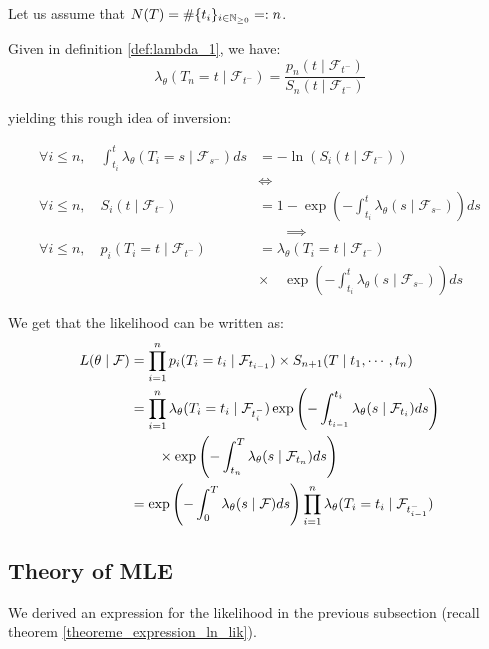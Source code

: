 \begin{demo}{}{}
Let us assume that $N(T) = \# \{  t_i  \}_{ i \in \mathbb{N}_{\geq 0}} =: n$.

Given in definition \ref{def:lambda_1}, we have:
$$\lambda_{\theta}( T_n = t \mid \mathcal F_{t^-} ) = \frac{ p_n( t \mid \mathcal F_{t^-} )}{S_n( t \mid \mathcal F_{t^-} )}$$


yielding this rough idea of inversion:

\begin{align*}
\forall i \leq n, \quad \int_{t_i}^t \lambda_{\theta}( T_i = s \mid \mathcal F_{s^-} ) ds &= - \ln ( S_i (t \mid \mathcal F_{t^-} ))  \\
& \iff \\
\forall i \leq n, \quad  S_i( t \mid \mathcal F_{t^-} ) & = 1 -  \exp \left ( - \int_{t_i}^t \lambda_{\theta} ( s \mid \mathcal F_{s^-} ) \right ) ds \\
& \qquad \implies  \\
\forall i \leq n, \quad  p_i( T_i = t \mid \mathcal F_{t^-} ) & = \lambda_{\theta} ( T_i = t \mid \mathcal F_{t^-} ) \\
& \times \quad \exp \left ( - \int_{t_i}^t \lambda_{\theta} ( s \mid \mathcal F_{s^-} ) \right ) ds 
\end{align*} 


We get that the likelihood can be written as:
\begin{align}
L( \theta \mid \mathcal F ) &= \prod_{i=1}^n p_i( T_i = t_i \mid \mathcal F_{t_{i-1}} ) \times S_{n+1} ( T \mid t_1, \cdots, t_n ) \notag \\
&=  \prod_{i=1}^n  \lambda_{\theta} ( T_i = t_i \mid \mathcal F_{t_i^-} ) \exp \left ( - \int_{t_{i-1}}^{t_{i}} \lambda_{\theta} ( s \mid \mathcal F_{t_i} ) ds \right ) \notag \\
 & \qquad \times \exp \left ( - \int_{t_n}^T \lambda_{\theta} ( s \mid \mathcal F_{t_n} ) ds \right ) \notag \\
&=  \exp \left ( - \int_{0}^{T} \lambda_{\theta} ( s \mid \mathcal F ) ds \right )  \prod_{i=1}^n  \lambda_{\theta} ( T_i = t_i \mid \mathcal F_{t_{i-1}^-} )   
\end{align}
\end{demo}{}{}













\subsection{Theory of MLE}
We derived an expression for the likelihood in the previous subsection (recall theorem \ref{theoreme_expression_ln_lik}). 

